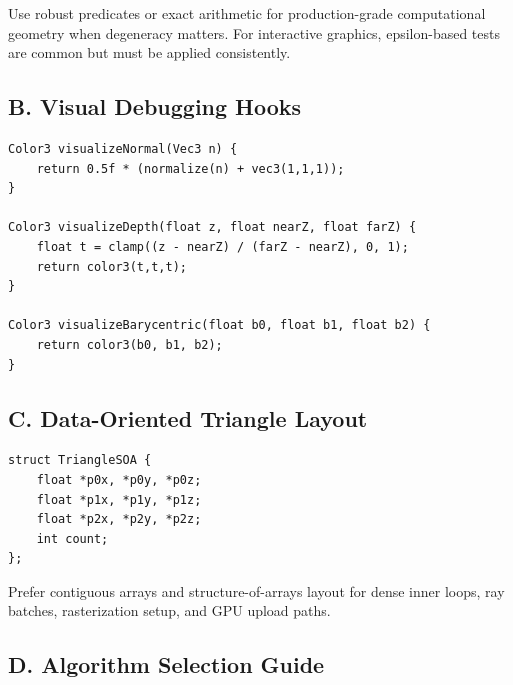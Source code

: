 \documentclass[10pt,letterpaper]{article}
\begin{document}
Use robust predicates or exact arithmetic for production-grade computational geometry when degeneracy matters. For interactive graphics, epsilon-based tests are common but must be applied consistently.

\subsection{B. Visual Debugging Hooks}

\begin{verbatim}
Color3 visualizeNormal(Vec3 n) {
    return 0.5f * (normalize(n) + vec3(1,1,1));
}

Color3 visualizeDepth(float z, float nearZ, float farZ) {
    float t = clamp((z - nearZ) / (farZ - nearZ), 0, 1);
    return color3(t,t,t);
}

Color3 visualizeBarycentric(float b0, float b1, float b2) {
    return color3(b0, b1, b2);
}
\end{verbatim}

\subsection{C. Data-Oriented Triangle Layout}

\begin{verbatim}
struct TriangleSOA {
    float *p0x, *p0y, *p0z;
    float *p1x, *p1y, *p1z;
    float *p2x, *p2y, *p2z;
    int count;
};
\end{verbatim}

Prefer contiguous arrays and structure-of-arrays layout for dense inner loops, ray batches, rasterization setup, and GPU upload paths.

\subsection{D. Algorithm Selection Guide}
\end{document}
